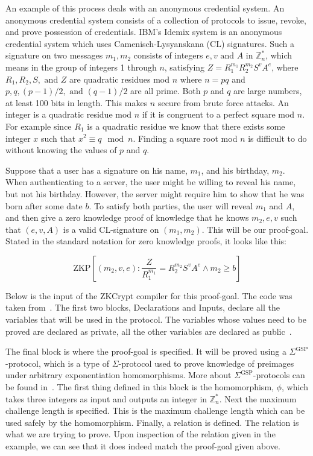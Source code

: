 \documentclass{sig-alternate}
\begin{document}
		An example of this process deals with an anonymous credential system. An anonymous
		credential system consists of a collection of protocols to issue, revoke, and prove
		possession of credentials. IBM's Idemix system is an anonymous credential system
		which uses Camenisch-Lysyanskana (CL) signatures. Such a signature on two messages 
		$m_{1}, m_{2}$ consists of integers $e, v \text{ and } A$ in $\mathbb{Z}^{*}_{n}$,
		which means in the group of integers 1 through $n$, satisfying
		$Z = R^{m_{1}}_{1}R^{m_{2}}_{2}S^{v}A^{e}$, where $R_{1}, R_{2}, S, \text{ and } Z$
		are quadratic residues mod $n$ where $n = pq$ and $p, q, (p-1)/2, \text{ and }
		(q-1)/2$ are all prime. Both $p$ and $q$ are large numbers, at least 100 bits in
		length. This makes $n$ secure from brute force attacks. 
		An integer is a quadratic residue mod $n$ if it is
		congruent to a perfect square mod $n$. For example since $R_{1}$ is a quadratic
		residue we know that there exists some integer $x$ such that $x^{2} \equiv q \mod n$.
		Finding a square root mod $n$ is difficult to do without knowing the values of
		$p$ and $q$.
		
		Suppose that a user has a signature on his name, $m_{1}$, and his birthday,
		$m_{2}$. When authenticating to a server, the user might be willing to reveal 
		his name, but not his birthday. However, the server might require him to show that 
		he was born	after some date $b$. To satisfy both parties, the user will reveal
		$m_{1}$ and $A$, and then give a zero knowledge proof of knowledge that he knows
		$m_{2}, e, v$ such that $(e, v, A)$ is a valid CL-signature on $(m_{1}, m_{2})$.
		This will be our proof-goal. Stated in the standard notation for zero knowledge
		proofs, it looks like this:
		
		\begin{equation*}
		\text{ZKP}[(m_{2}, v, e): \frac{Z}{R^{m_{1}}_{1}} = R^{m_{2}}_{2}S^{v}A^{e} \land m_{2} \ge b]
		\end{equation*}
		
		Below is the input of the ZKCrypt compiler for this proof-goal. The code was taken
		from~\cite{ZKCrypt:2012}. The first two blocks, Declarations and Inputs, declare 
		all the variables that will be used in the protocol. The variables whose values
		need to be proved are declared as private, all the other variables are declared as
		public~\cite{ZKCrypt:2012}.
		
		The final block is 	where the proof-goal is specified. It will be proved using a
		$\Sigma^{\textrm{GSP}}$-protocol, which is a type of $\Sigma$-protocol used to prove
		knowledge of preimages under arbitrary exponentiation homomorphisms. More about 
		$\Sigma^{\textrm{GSP}}$-protocols can be found in~\cite{ZKCrypt:2012}.
		The first thing defined in this block is the homomorphism, $\phi$, which takes
		three integers as input and outputs an integer in $\mathbb{Z}^{*}_{n}$. Next the
		maximum challenge length is specified. This is the maximum challenge length which can
		be used safely by the homomorphism. Finally, a relation is defined. The relation
		is what we are trying to prove. Upon inspection of the relation given in the example,
		we can see that it does indeed match the proof-goal given above.
				
\end{document}
